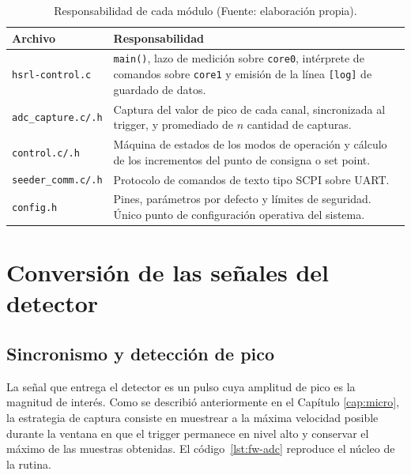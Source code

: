 \begin{table}[h]
\centering
  \begin{tabular}{@{}p{}p{}@{}}
  \toprule
  \textbf{Archivo} & \textbf{Responsabilidad} \\
  \midrule
  \texttt{hsrl-control.c} & \texttt{main()}, lazo de medición sobre \texttt{core0}, intérprete de comandos sobre \texttt{core1} y emisión de la línea \texttt{[log]} de guardado de datos. \\
  \texttt{adc\_capture.c/.h} & Captura del valor de pico de cada canal, sincronizada al trigger, y promediado de $n$ cantidad de capturas. \\
  \texttt{control.c/.h} & Máquina de estados de los modos de operación y cálculo de los incrementos del punto de consigna o set point. \\
  \texttt{seeder\_comm.c/.h} & Protocolo de comandos de texto tipo SCPI sobre UART. \\
  \texttt{config.h} & Pines, parámetros por defecto y límites de seguridad. Único punto de configuración operativa del sistema. \\
  \bottomrule
  \end{tabular}
  \caption{Responsabilidad de cada módulo (Fuente: elaboración propia).}
\label{tab:fw-modulos}
\end{table}

\section{Conversión de las señales del detector}
\label{sec:fw-adquisicion}

\subsection{Sincronismo y detección de pico}

La señal que entrega el detector es un pulso cuya amplitud de pico es la magnitud de interés. Como se describió anteriormente en el Capítulo \ref{cap:micro}, la estrategia de captura consiste en muestrear a la máxima velocidad posible durante la ventana en que el trigger permanece en nivel alto y conservar el máximo de las muestras obtenidas. El código~\ref{lst:fw-adc} reproduce el núcleo de la rutina.

